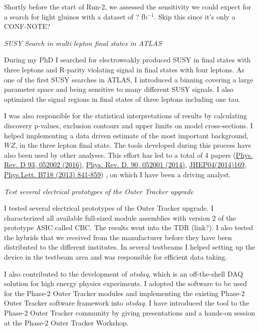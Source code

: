 \documentclass[]{cv} %
\begin{document}
\begin{resume}
Shortly before the start of Run-2, we assessed the sensitivity we could expect
for a search for light gluinos with a dataset of ? fb$^{-1}$. Skip this since
it's only a CONF-NOTE?

\vspace{15pt}
\Large{}
\textit{SUSY Search in multi lepton final states in ATLAS} \\
\normalsize{}

During my PhD I searched for electroweakly produced SUSY in final states with
three leptons and R-parity violating signal in final states with four leptons.
As one of the first SUSY searches in ATLAS, I introduced a binning covering a
large parameter space and being sensitive to many different SUSY signals. I also
optimized the signal regions in final states of three leptons including one tau. 

I was also responsible for the statistical interpretations of results by
calculating discovery p-values, exclusion contours and upper limits on model
cross-sections. I helped implementing a data driven estimate of the most
important background, $WZ$, in the three lepton final state. The tools
developed during this process have also been used by other analyses. This effort
has led to a total of 4 papers
(\href{https://journals.aps.org/prd/abstract/10.1103/PhysRevD.93.052002}
{Phys.  Rev. D 93, 052002 (2016)},
\href{https://journals.aps.org/prd/abstract/10.1103/PhysRevD.90.052001}
{Phys. Rev. D. 90, 052001 (2014)},
\href{https://link.springer.com/article/10.1007\%2FJHEP04\%282014\%29169}
{JHEP04(2014)169},
\href{https://www.sciencedirect.com/science/article/pii/S037026931201204X?via\%3Dihub}
{Phys.Lett. B718 (2013) 841-859})
, on which I have been a driving analyst.

\vspace{15pt}
\Large{}
\textit{Test several electrical prototypes of the Outer Tracker upgrade} \\
\normalsize{}

I tested several electrical prototypes of the Outer Tracker upgrade. I
characterized all available full-sized module assemblies with version 2 of the
prototype ASIC called CBC. The results went into the TDR (link?). I also tested
the hybrids that we received from the manufacturer before they have been
distributed to the different institutes. In several testbeams I helped setting
up the device in the testbeam area and was responsible for efficient data
taking.

I also contributed to the development of \textit{otsdaq}, which is an
off-the-shell DAQ solution for high energy physics experiments. I adopted the
software to be used for the Phase-2 Outer Tracker modules and implementing the
existing Phase-2 Outer Tracker software framework into \textit{otsdaq}. I have
introduced the tool to the Phase-2 Outer Tracker community by giving
presentations and a hands-on session at the Phase-2 Outer Tracker Workshop.


\end{resume}
\end{document}
